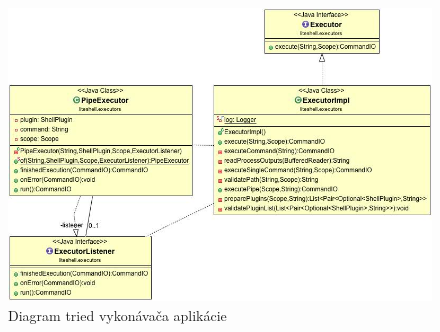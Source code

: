 \begin{figure}[!htbp]
	\centering
	\includegraphics[width=\linewidth]{img/executor.jpg}
	\caption{Diagram tried vykonávača aplikácie}
	\label{fig:test}
\end{figure}